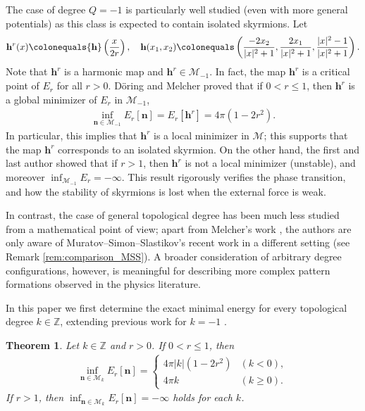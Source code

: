 \documentclass{amsart}
\numberwithin{equation}{section}
\newtheorem{theorem}{Theorem}[section]
\theoremstyle{definition}
\theoremstyle{remark}
\newcommand{\Z}{\mathbb{Z}}
\newcommand{\boM}{\mathcal{M}}
\newcommand{\bh}{{\mathbf{h}}}
\newcommand{\bn}{{\mathbf{n}}}
\begin{document}
The case of degree $Q=-1$ is particularly well studied (even with more general potentials) as this class is expected to contain isolated skyrmions.
Let
\begin{equation}\label{eq:hm}
\bh^r(x)\colonequals\bh\left(\frac{x}{2r}\right), \quad
\bh(x_1,x_2) \colonequals
\left(
\frac{-2x_2}{|x|^2 + 1} , \frac{2x_1}{|x|^2 +1} ,  \frac{|x|^2-1}{|x|^2+1}
\right).
\end{equation}
Note that $\bh^r$ is a harmonic map and $\bh^r\in\boM_{-1}$.
In fact, the map $\bh^r$ is a critical point of $E_r$ for all $r>0$.
D\"oring and Melcher \cite{MR3639614} proved that if $0<r\leq1$, then $\bh^r$ is a global minimizer of $E_r$ in $\boM_{-1}$,
\begin{align*}
    \inf_{\bn\in\boM_{-1}}E_r[\bn] = E_r[\bh^r] = 4\pi(1-2r^2).
\end{align*}
In particular, this implies that $\bh^r$ is a local minimizer in $\boM$; this supports that the map $\bh^r$ corresponds to an isolated skyrmion.
On the other hand, the first and last author \cite{MR4630481} showed that if $r>1$, then $\bh^r$ is not a local minimizer (unstable), and moreover $\inf_{\boM_{-1}}E_r=-\infty$.
This result rigorously verifies the phase transition, and how the stability of skyrmions is lost when the external force is weak.

In contrast, the case of general topological degree has been much less studied from a mathematical point of view; apart from Melcher's work \cite[Section 3]{MR3269033}, the authors are only aware of Muratov--Simon--Slastikov's recent work \cite{MR4961803} in a different setting (see Remark \ref{rem:comparison_MSS}).  
A broader consideration of arbitrary degree configurations, however, is meaningful for describing more complex pattern formations observed in the physics literature.

\medskip

In this paper we first determine the exact minimal energy for every topological degree $k\in\Z$, extending previous work for $k=-1$ \cite{MR3639614,MR4630481}.

\begin{theorem}\label{thm:main1_energy_formula}
    Let $k\in\Z$ and $r>0$.
    If $0<r\leq1$, then
    \begin{align*}
       \inf_{\bn\in\boM_k}E_r[\bn]=
       \begin{cases}
           4\pi|k|(1-2r^2) & (k<0),\\
           4\pi k & (k\geq0).
       \end{cases} 
    \end{align*}
    If $r>1$, then $\inf_{\bn\in\boM_k}E_r[\bn]=-\infty$ holds for each $k$.
\end{theorem}
\end{document}
